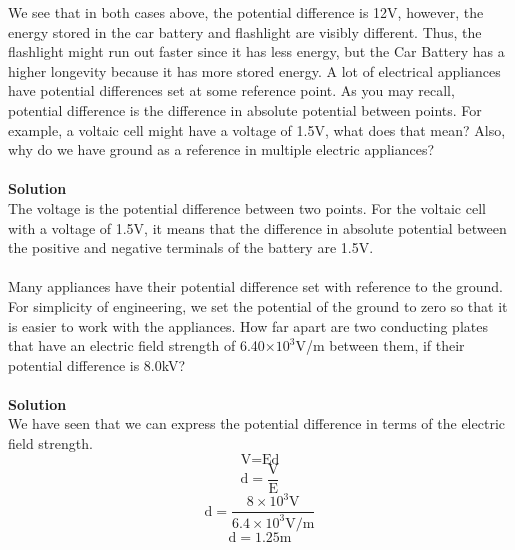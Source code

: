 \documentclass[9pt,addpoints]{exam}
\begin{document}
\begin{questions}
		We see that in both cases above, the potential difference is 12V, however, the energy stored in the car battery and flashlight are visibly different. Thus, the flashlight might run out faster since it has less energy, but the Car Battery has a higher longevity because it has more stored energy.
		\question A lot of electrical appliances have potential differences set at some reference point. As you may recall, potential difference is the difference in absolute potential between points. For example, a voltaic cell might have a voltage of 1.5V, what does that mean? Also, why do we have ground as a reference in multiple electric appliances?\\ \\
		\textbf{Solution}\\
		The voltage is the potential difference between two points. For the voltaic cell with a voltage of 1.5V, it means that the difference in absolute potential between the positive and negative terminals of the battery are 1.5V. \\ \\
		Many appliances have their potential difference set with reference to the ground. For simplicity of engineering, we set the potential of the ground to zero so that it is easier to work with the appliances. 
		\question How far apart are two conducting plates that have an electric field strength of  6.40×$10^3$V/m  between them, if their potential difference is 8.0kV?\\ \\
		\textbf{Solution}\\	
		We have seen that we can express the potential difference in terms of the electric field strength.
		$$\text{V}=\text{Ed}$$
		$$\text{d}=\dfrac{\text{V}}{\text{E}}$$
		$$\text{d}=\dfrac{8\times10^3\text{V}}{6.4\times10^3\text{V/m}}$$
		$$\text{d}=1.25\text{m}$$	

\end{questions}
\end{document}
